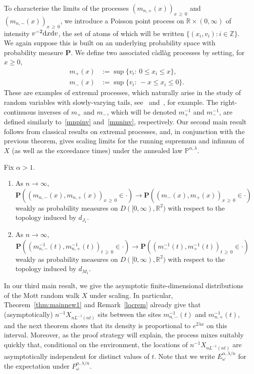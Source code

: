 \documentclass[AHL,Unicode,longabstracts,published]{cedram}
\newcommand{\Z}{\mathbb Z}
\newcommand{\R}{\mathbb R}
\renewcommand{\P}{\mathbb P}
\newcommand{\bfP}{\mathbf{P}}
\newcommand{\dd}{\text{\upshape{d}}}
\newcommand{\cadlag}{càdlàg }
\newcommand*{\alphenumi}{\renewcommand*{\theenumi}{\alph{enumi}}}
\begin{document}
To characterise the limits of the processes $(m_{n,+}(x))_{x\,\geq\,0}$ and $(m_{n,-}(x))_{x\,\geq\,0}$, we introduce a Poisson point process on $\R\times (0,\infty)$ of intensity $v^{-2}\dd x\dd v$, the set of atoms of which will be written $\{(x_i,v_i):i\in\Z\}$. We again suppose this is built on an underlying probability space with probability measure $\bfP$. We define two associated \cadlag processes by setting, for $x\geq 0$,
\begin{align}
m_+(x)&:=\sup\{v_i:\:0\leq x_i\leq x\},\label{mplus}
\\
m_-(x)&:=\sup\{v_i:\:-x\leq x_i\leq 0\}.\label{mminus}
\end{align}
These are examples of extremal processes, which naturally arise in the study of random variables with slowly-varying tails, see~\cite{Kasa} and~\cite[Chapter~4]{Res87}, for example. The right-continuous inverses of $m_+$ and $m_-$, which will be denoted $m_+^{-1}$ and $m_-^{-1}$, are defined similarly to~\eqref{mnpinv} and~\eqref{mnninv}, respectively. Our second main result follows from classical results on extremal processes, and, in conjunction with the previous theorem, gives scaling limits for the running supremum and infimum of $X$ (as well as the exceedance times) under the annealed law $\P^{\alpha,\lambda}$.

\begin{theo}\label{thm:mainnew2}
Fix $\alpha>1$.
\begin{enumerate}\alphenumi
\item\label{theo1.3.a} As $n\rightarrow\infty$,
\[
\bfP\left(\left(m_{n,-}(x),m_{n,+}(x)\right)_{x\,\geq\,0}\in\cdot\right)\rightarrow\bfP\left(\left(m_-(x),m_+(x)\right)_{x\,\geq\,0}\in\cdot\right)
\]
weakly as probability measures on $D([0,\infty),\R^2)$ with respect to the topology induced by $d_{J_1}$. 
\item\label{theo1.3.b} As $n\rightarrow\infty$,
\[
\bfP\left(\left(m_{n,-}^{-1}(t),m_{n,+}^{-1}(t)\right)_{t\,\geq\,0}\in\cdot\right)\rightarrow\bfP\left(\left(m_-^{-1}(t),m_+^{-1}(t)\right)_{t\,\geq\,0}\in\cdot\right)
\]
weakly as probability measures on $D([0,\infty),\R^2)$ with respect to the topology induced by $d_{M_1}$.
\end{enumerate}
\end{theo}

In our third main result, we give the asymptotic finite-dimensional distributions of the Mott random walk $X$ under scaling. In particular, Theorem~\ref{thm:mainnew1} and Remark~\ref{locrem} already give that (asymptotically) $n^{-1}{X}_{nL^{-1}(nt)}$ sits between the sites $m_{n,-}^{-1}(t)$ and $m_{n,+}^{-1}(t)$, and the next theorem shows that its density is proportional to $e^{2\lambda x}$ on this interval. Moreover, as the proof strategy will explain, the process mixes suitably quickly that, conditional on the environment, the locations of $n^{-1}{X}_{nL^{-1}(nt)}$ are asymptotically independent for distinct values of $t$. Note that we write $E^{\alpha,\lambda/n}_\omega$ for the expectation under $P^{\alpha,\lambda/n}_\omega$.
\end{document}
